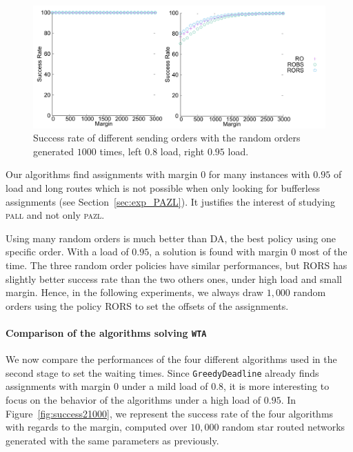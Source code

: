 \documentclass[a4paper,10pt]{journal}
\newcommand\greedydeadline{\texttt{GreedyDeadline}\xspace}
\newcommand\pazl{\textsc{pazl}\xspace}
\newcommand\pall{\textsc{pall}\xspace}
\begin{document}
\begin{figure}[h] 
  \centering
  \includegraphics[width=\linewidth]{departs_gp2.pdf}

    
       \caption{Success rate of different sending orders with the random orders generated $1000$ times, left $0.8$ load, right $0.95$ load.}
      \label{fig:success1000random}
          \end{figure}

     Our algorithms find assignments with margin $0$ for many instances with $0.95$ of load and long routes which is not possible when only looking for bufferless assignments (see Section~\ref{sec:exp_PAZL}). It justifies the interest of studying \pall and not only \pazl.
  
     Using many random orders is much better than DA, the best policy using one specific order. 
     With a load of $0.95$, a solution is found with margin $0$ most of the time. The three random order policies have similar performances, but RORS has slightly better success rate than the two others ones, under high load and small margin. Hence, in the following experiments, we always draw $1,000$ random orders using the policy RORS to set the offsets of the assignments.
     

    \paragraph{Comparison of the algorithms solving \texttt{WTA}}

     We now compare the performances of the four different algorithms used in the second stage to set the waiting times. Since \greedydeadline already finds assignments with margin $0$ under a mild load of $0.8$, it is more interesting to focus on the behavior of the algorithms under a high load of $0.95$. In Figure~\ref{fig:success21000}, we represent the success rate of the four algorithms with regards to the margin, computed over $10,000$ random star routed networks generated with the same parameters as previously. 
     
\end{document}
